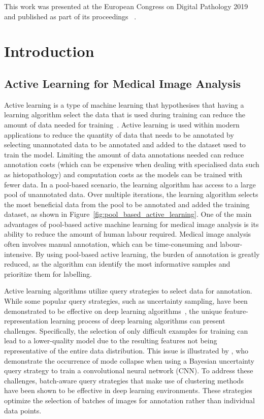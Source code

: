 This work was presented at the European Congress on Digital Pathology 2019 and published as part of its proceedings ~\citep{carse2019active}.



\section{Introduction}
\label{sec:active_introduction}
\subsection{Active Learning for Medical Image Analysis}
\label{subsec:active_for_medical_image_analysis}
Active learning is a type of machine learning that hypothesises that having a learning algorithm select the data that is used during training can reduce the amount of data needed for training~\citep{settles2012active}. Active learning is used within modern applications to reduce the quantity of data that needs to be annotated by selecting unannotated data to be annotated and added to the dataset used to train the model. Limiting the amount of data annotations needed can reduce annotation costs (which can be expensive when dealing with specialised data such as histopathology) and computation costs as the models can be trained with fewer data. In a pool-based scenario, the learning algorithm has access to a large pool of unannotated data. Over multiple iterations, the learning algorithm selects the most beneficial data from the pool to be annotated and added the training dataset, as shown in Figure~\ref{fig:pool_based_active_learning}. One of the main advantages of pool-based active machine learning for medical image analysis is its ability to reduce the amount of human labour required. Medical image analysis often involves manual annotation, which can be time-consuming and labour-intensive. By using pool-based active learning, the burden of annotation is greatly reduced, as the algorithm can identify the most informative samples and prioritize them for labelling.

Active learning algorithms utilize query strategies to select data for annotation. While some popular query strategies, such as uncertainty sampling, have been demonstrated to be effective on deep learning algorithms~\citep{gal2017deep}, the unique feature-representation learning process of deep learning algorithms can present challenges. Specifically, the selection of only difficult examples for training can lead to a lower-quality model due to the resulting features not being representative of the entire data distribution. This issue is illustrated by \cite{pop2018deep}, who demonstrate the occurrence of mode collapse when using a Bayesian uncertainty query strategy to train a convolutional neural network (CNN). To address these challenges, batch-aware query strategies that make use of clustering methods have been shown to be effective in deep learning environments\citep{sener2017active, zhdanov2019diverse, kirsch2019batchbald}. These strategies optimize the selection of batches of images for annotation rather than individual data points.

